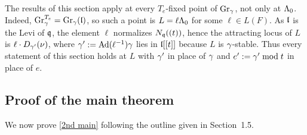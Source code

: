 \documentclass[11pt]{article}
\numberwithin{equation}{section}
\begin{document}
\begin{rem} \label{all fixed point}
The results of this section apply at every $T_e$-fixed point of $\operatorname{Gr}_\gamma$, not
only at $\Lambda_0$. Indeed, $\operatorname{Gr}_\gamma^{T_e}=\operatorname{Gr}_\gamma(\mathfrak{l})$, so such a point is
$L=\ell\Lambda_0$ for some $\ell\in L(F)$. As $\mathfrak{l}$ is the Levi of $\mathfrak{q}$, the
element $\ell$ normalizes $N_{\mathfrak{q}}((t))$, hence the attracting locus of $L$ is
$\ell\cdot D_{\gamma'}(\nu)$, where $\gamma':=\operatorname{Ad}(\ell^{-1})\gamma$ lies in $\mathfrak{l}[[t]]$
because $L$ is $\gamma$-stable. Thus every statement of this section holds at $L$
with $\gamma'$ in place of $\gamma$ and $e':=\gamma'\bmod t$ in place of $e$.
\end{rem}
\subsection{Proof of the main theorem}
We now prove \cref{2nd main} following the outline given in Section~1.5.
\end{document}
